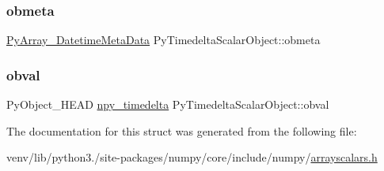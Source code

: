 \subsubsection{\texorpdfstring{obmeta}{obmeta}}
{\footnotesize\ttfamily \hyperlink{structPyArray__DatetimeMetaData}{Py\+Array\+\_\+\+Datetime\+Meta\+Data} Py\+Timedelta\+Scalar\+Object\+::obmeta}

\mbox{\label{structPyTimedeltaScalarObject_a44e85d0dc4d7671e44ebd573614f7170}} 
\subsubsection{\texorpdfstring{obval}{obval}}
{\footnotesize\ttfamily Py\+Object\+\_\+\+H\+E\+AD \hyperlink{npy__common_8h_a37d0380d114c93c437279e4ed3e8fdf8}{npy\+\_\+timedelta} Py\+Timedelta\+Scalar\+Object\+::obval}



The documentation for this struct was generated from the following file\+:\begin{DoxyCompactItemize}
\item 
venv/lib/python3./site-\/packages/numpy/core/include/numpy/\hyperlink{arrayscalars_8h}{arrayscalars.\+h}\end{DoxyCompactItemize}
